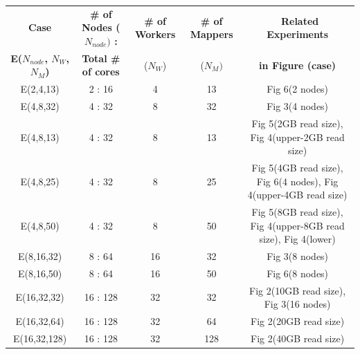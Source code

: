 \documentclass{acm_proc_article-sp}
\begin{document}
\begin{center}
\begin{table}[ht]
\small
\hfill{}
 \begin{tabular}{|c|c|c|c|c|} 
 \hline 

 \textbf{Case} &  \textbf{ \# of  Nodes ($N_{node})$ :}  &  \textbf{\# of Workers} &   \textbf{\# of Mappers} & \  \textbf{Related Experiments} \\
 \textbf{E($N_{node}$, $N_W$,  $N_M$)} &  \textbf{Total \# of cores} &   ($N_W$)  & ($N_M)$  &  \textbf{ in Figure (case)}  \\
 \hline
  \hline
E(2,4,13) &2 : 16 & 4 & 13 & Fig 6(2 nodes) \\
E(4,8,32) & 4 : 32 & 8 & 32 & Fig 3(4 nodes) \\
E(4,8,13) & 4 : 32 & 8 & 13 & Fig 5(2GB read size), Fig 4(upper-2GB read size) \\
E(4,8,25) & 4 : 32 & 8 & 25 & Fig 5(4GB read size), Fig 6(4 nodes), Fig 4(upper-4GB read size) \\ 
E(4,8,50) & 4 : 32 & 8 & 50 & Fig 5(8GB read size), Fig 4(upper-8GB read size), Fig 4(lower)\\ 
E(8,16,32) & 8 : 64 & 16 & 32 & Fig 3(8 nodes)\\ 
E(8,16,50) & 8 : 64& 16 & 50 & Fig 6(8 nodes)\\ 
E(16,32,32) & 16 : 128 & 32 & 32 & Fig 2(10GB read size), Fig 3(16 nodes)\\ 
E(16,32,64) & 16 : 128 & 32 & 64 & Fig 2(20GB read size)\\ 
E(16,32,128) & 16 : 128 & 32 & 128 & Fig 2(40GB read size)\\ 


 \hline
 \end{tabular}
 \hfill{}



\end{table}
\end{center}
\end{document}
